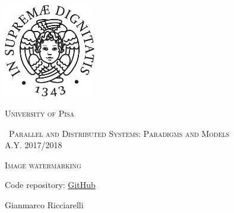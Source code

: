 \begin{titlepage}
  \centering
  \includegraphics[width=0.30\textwidth]{imgs/cherubino_black.pdf}\par\vspace{1cm}
  {\scshape\LARGE University of Pisa \par}
  \vspace{1cm}
  {\scshape\ Parallel and Distributed Systems: Paradigms and Models \\A.Y. 2017/2018\par}
  \vspace{1.5cm}
  {\scshape \Huge Image watermarking \par}
  \vspace{1cm}
  {Code repository: \href{https://github.com/germz01/PDS_project}{GitHub}\par}
  \vfill
  {\Large Gianmarco Ricciarelli\par}
\end{titlepage}
